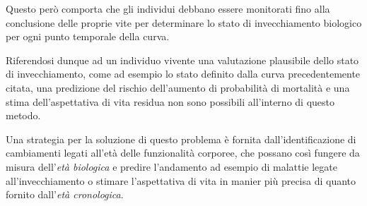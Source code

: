 \documentclass[a4paper]{report}
\begin{document}
Questo però comporta che gli individui debbano essere monitorati fino alla conclusione delle proprie vite per determinare lo stato di invecchiamento biologico per ogni punto temporale della curva.

Riferendosi dunque ad un individuo vivente una valutazione plausibile dello stato di invecchiamento, come ad esempio lo stato definito dalla curva precedentemente citata, una predizione del rischio dell'aumento di probabilità di mortalità e una stima dell'aspettativa di vita residua non sono possibili all'interno di questo metodo.

Una strategia per la soluzione di questo problema è fornita dall'identificazione di cambiamenti legati all'età delle funzionalità corporee, che possano così fungere da misura dell'\textit{età biologica} e predire l'andamento ad esempio di malattie legate all'invecchiamento o stimare l'aspettativa di vita in manier più precisa di quanto fornito dall'\textit{età cronologica}.
\end{document}
